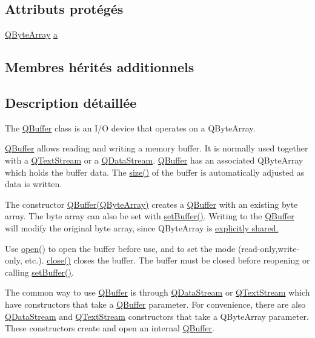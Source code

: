 \subsection*{Attributs protégés}
\begin{DoxyCompactItemize}
\item 
\hyperlink{qcstring_8h_ad6a390648110655c217fe072d45fbcf5}{Q\+Byte\+Array} \hyperlink{class_q_buffer_a25221a1da1f29140c2fbb75dd0a5ee4e}{a}
\end{DoxyCompactItemize}
\subsection*{Membres hérités additionnels}


\subsection{Description détaillée}
The \hyperlink{class_q_buffer}{Q\+Buffer} class is an I/\+O device that operates on a Q\+Byte\+Array. 

\hyperlink{class_q_buffer}{Q\+Buffer} allows reading and writing a memory buffer. It is normally used together with a \hyperlink{class_q_text_stream}{Q\+Text\+Stream} or a \hyperlink{class_q_data_stream}{Q\+Data\+Stream}. \hyperlink{class_q_buffer}{Q\+Buffer} has an associated Q\+Byte\+Array which holds the buffer data. The \hyperlink{class_q_buffer_a2e1a92c8a10018989540dda59bb4db18}{size()} of the buffer is automatically adjusted as data is written.

The constructor {\ttfamily \hyperlink{class_q_buffer_ac88f81ed56581532b835e83812a8650a}{Q\+Buffer(\+Q\+Byte\+Array)}} creates a \hyperlink{class_q_buffer}{Q\+Buffer} with an existing byte array. The byte array can also be set with \hyperlink{class_q_buffer_ad4c608788c2730ca60295488f75da423}{set\+Buffer()}. Writing to the \hyperlink{class_q_buffer}{Q\+Buffer} will modify the original byte array, since Q\+Byte\+Array is \hyperlink{}{explicitly shared.}

Use \hyperlink{class_q_buffer_aa3ceff2217a13a570e0dcec157b23b18}{open()} to open the buffer before use, and to set the mode (read-\/only,write-\/only, etc.). \hyperlink{class_q_buffer_affd0b382476516b0d4e3adfaf27c0247}{close()} closes the buffer. The buffer must be closed before reopening or calling \hyperlink{class_q_buffer_ad4c608788c2730ca60295488f75da423}{set\+Buffer()}.

The common way to use \hyperlink{class_q_buffer}{Q\+Buffer} is through  \hyperlink{class_q_data_stream}{Q\+Data\+Stream} or  \hyperlink{class_q_text_stream}{Q\+Text\+Stream} which have constructors that take a \hyperlink{class_q_buffer}{Q\+Buffer} parameter. For convenience, there are also \hyperlink{class_q_data_stream}{Q\+Data\+Stream} and \hyperlink{class_q_text_stream}{Q\+Text\+Stream} constructors that take a Q\+Byte\+Array parameter. These constructors create and open an internal \hyperlink{class_q_buffer}{Q\+Buffer}.

